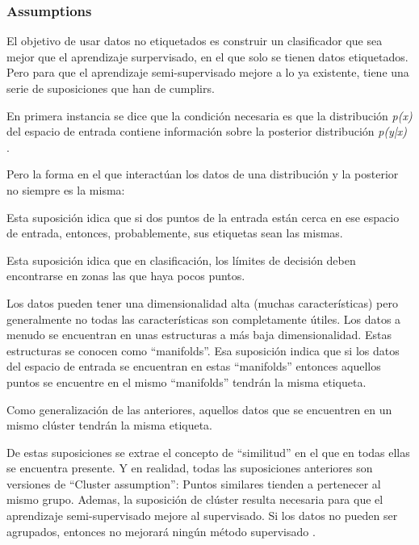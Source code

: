 \subsubsection{Assumptions}
El objetivo de usar datos no etiquetados es construir un clasificador que sea
mejor que el aprendizaje surpervisado, en el que solo se tienen datos
etiquetados. Pero para que el aprendizaje semi-supervisado mejore a lo ya
existente, tiene una serie de suposiciones que han de cumplirs.

En primera instancia se dice que la condición necesaria es que la distribución
\textit{p(x)} del espacio de entrada contiene información sobre la posterior
distribución \textit{p(y|x)} \cite{vanEngelen2020}.

Pero la forma en el que interactúan los datos de una distribución y la posterior
no siempre es la misma:

\begin{tcolorbox}[colback=cyan!5!white,colframe=cyan!75!black,title=Smoothness assumption]
    Esta suposición idica que si dos puntos de la entrada están cerca en ese
    espacio de entrada, entonces, probablemente, sus etiquetas sean las mismas.
\end{tcolorbox}

\begin{tcolorbox}[colback=cyan!5!white,colframe=cyan!75!black,title=Low-density assumption]
    Esta suposición idica que en clasificación, los límites de decisión deben
    encontrarse en zonas las que haya pocos puntos.
\end{tcolorbox}

\begin{tcolorbox}[colback=cyan!5!white,colframe=cyan!75!black,title=Manifold assumption]
    Los datos pueden tener una dimensionalidad alta (muchas características)
    pero generalmente no todas las características son completamente útiles. Los
    datos a menudo se encuentran en unas estructuras a más baja dimensionalidad.
    Estas estructuras se conocen como ``manifolds''. Esa suposición indica que
    si los datos del espacio de entrada se encuentran en estas ``manifolds''
    entonces aquellos puntos se encuentre en el mismo ``manifolds'' tendrán la misma etiqueta. \cite{towardsdatascience:semi} \cite{vanEngelen2020}
\end{tcolorbox}

\begin{tcolorbox}[colback=cyan!5!white,colframe=cyan!75!black,title=Cluter assumption]
    Como generalización de las anteriores, aquellos datos que se encuentren en
    un mismo clúster tendrán la misma etiqueta.
\end{tcolorbox}

De estas suposiciones se extrae el concepto de ``similitud'' en el que en todas
ellas se encuentra presente. Y en realidad, todas las suposiciones anteriores
son versiones de ``Cluster assumption'': Puntos similares tienden a pertenecer
al mismo grupo. Ademas, la suposición de clúster resulta necesaria para que el
aprendizaje semi-supervisado mejore al supervisado. Si los datos no pueden ser
agrupados, entonces no mejorará ningún método supervisado \cite{vanEngelen2020}.